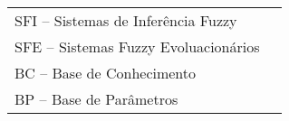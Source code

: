 
\begin{thenotations}

  \noindent
  \begin{tabular}{ll}
    SFI -- Sistemas de Inferência Fuzzy\\
    SFE -- Sistemas Fuzzy Evoluacionários\\
    BC -- Base de Conhecimento\\
    BP -- Base de Parâmetros\\
  \end{tabular}

\end{thenotations}
